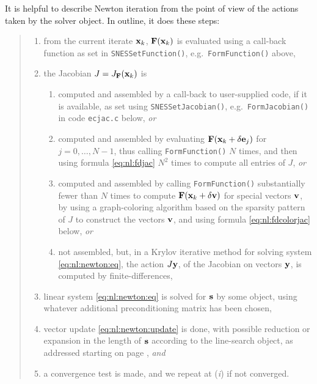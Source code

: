 It is helpful to describe Newton iteration from the point of view of the actions taken by the \pSNES solver object.  In outline, it does these steps:
\begin{quote}
	\renewcommand{\labelenumi}{(\emph{\roman{enumi}})}
	\renewcommand{\labelenumii}{\emph{\alph{enumii}}.}
	\begin{enumerate}
	\item from the current iterate $\mathbf{x}_k$, $\mathbf{F}(\mathbf{x}_k)$ is evaluated using a call-back function as set in \texttt{SNESSetFunction()}, e.g.~\texttt{FormFunction()} above,
	\item the Jacobian $J=J_{\mathbf{F}}(\mathbf{x}_k)$ is
	    \begin{enumerate}
	    \item computed and assembled by a call-back to user-supplied code, if it is available, as set using \texttt{SNESSetJacobian()}, e.g.~\texttt{FormJacobian()} in code \texttt{ecjac.c} below, \emph{or}
	    \item computed and assembled by evaluating $\mathbf{F}(\mathbf{x}_k+\delta \mathbf{e}_j)$ for $j=0,\dots,N-1$, thus  calling \texttt{FormFunction()} $N$ times, and then using formula \eqref{eq:nl:fdjac} $N^2$ times to compute all entries of $J$, \emph{or}
	    \item computed and assembled by calling \texttt{FormFunction()} substantially fewer than $N$ times to compute $\mathbf{F}(\mathbf{x}_k+\delta \mathbf{v})$ for special vectors $\mathbf{v}$, by using a graph-coloring algorithm based on the sparsity pattern of $J$ to construct the vectors $\mathbf{v}$, and using formula \eqref{eq:nl:fdcolorjac} below, \emph{or}
	    \item not assembled, but, in a Krylov iterative method for solving system \eqref{eq:nl:newton:eq}, the action $J \mathbf{y}$, of the Jacobian on vectors $\mathbf{y}$, is computed by finite-differences,
        \end{enumerate}
	\item linear system \eqref{eq:nl:newton:eq} is solved for $\mathbf{s}$ by some \pKSP object, using whatever additional preconditioning matrix has been chosen,
	\item vector update \eqref{eq:nl:newton:update} is done, with possible reduction or expansion in the length of $\mathbf{s}$ according to the line-search object, as addressed starting on page \pageref{sec:linesearch}, \emph{and}
	\item a convergence test is made, and we repeat at (\emph{i}) if not converged.
	\end{enumerate}
\end{quote}

